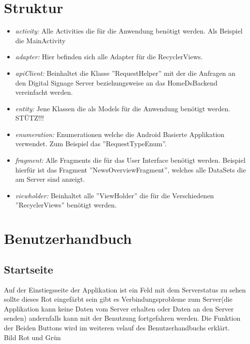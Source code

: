 \section{Struktur}
\begin{itemize}
	\item {\em activity:} Alle Activities die für die Anwendung benötigt werden. Als Beispiel die MainActivity
	
	\item {\em adapter:} Hier befinden sich alle Adapter für die RecyclerViews.
	
	\item {\em apiClient:} Beinhaltet die Klasse ''RequestHelper'' mit der die Anfragen an den Digital Signage Server beziehungsweise an das HomeDsBackend vereinfacht werden.
	
	\item {\em entity:} Jene Klassen die als Models für die Anwendung benötigt werden. 
	STÜTZ!!!
	
	\item {\em enumeration:} Enumerationen welche die Android Basierte Applikation verwendet. Zum Beispiel das ''RequestTypeEnum''.
	
	\item {\em fragment:} Alle Fragments die für das User Interface benötigt werden. Beispiel hierfür ist das Fragment ''NewsOverviewFragment'', welches alle DataSets die am Server sind anzeigt.
	
	\item {\em viewholder:} Beinhaltet alle ''ViewHolder'' die für die Verschiedenen ''RecyclerViews'' benötigt werden. 		
\end{itemize}
\section{Benutzerhandbuch}
\subsection{Startseite}
Auf der Einstiegsseite der Applikation ist ein Feld mit dem Serverstatus zu sehen sollte dieses Rot eingefärbt sein gibt es Verbindungsprobleme zum Server(die Applikation kann keine Daten vom Server erhalten oder Daten an den Server senden) andernfalls kann mit der Benutzung fortgefahren werden. Die Funktion der Beiden Buttons wird im weiteren velauf des Benutzerhandbuchs erklärt.
\\
Bild Rot und Grün
\\
